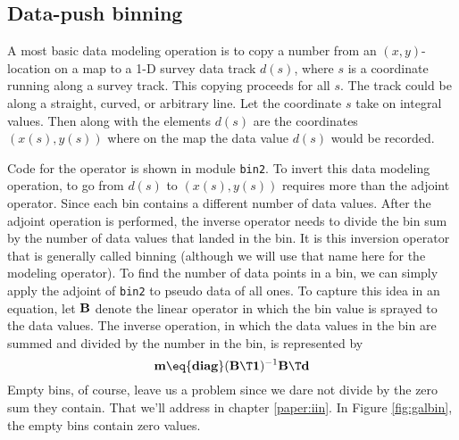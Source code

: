 \subsection{Data-push binning}
A most basic data modeling operation is to copy a number from an $(x,y)$-location on a map
to a 1-D survey data track $d(s)$, where $s$ is a coordinate running along a survey track.
This copying proceeds for all $s$.
The track could be along a straight, curved, or arbitrary line.
Let the coordinate $s$ take on integral values.
Then along with the elements $d(s)$ are the coordinates $(x(s),y(s))$ where on the map the data value $d(s)$ would be recorded.
\par
Code for the operator is shown
in module \texttt{bin2}.
To invert this data modeling operation, to go from $d(s)$ to $(x(s),y(s))$ requires more than the adjoint operator.
Since each bin contains a different number of data values.
After the adjoint operation is performed,
the inverse operator needs to divide the bin sum by the number of data values that landed in the bin.
It is this inversion operator that is generally called binning (although we will use that name here for the modeling operator).
To find the number of data points in a bin,
we can simply apply the adjoint of \texttt{bin2} to pseudo data of all ones.
To capture this idea in an equation,
let $\bold B$ denote the linear operator
in which the bin value is sprayed to the data values.
The inverse operation,
in which the data values in the bin are summed
and divided by the number in the bin, is represented by
\begin{equation}
\bold m \eq {\bf diag}( \bold B\T \bold 1)^{-1} \bold B\T \bold d
\label{eqn:dpbin}
\end{equation}
Empty bins, of course, leave us a problem since we dare not divide by the zero sum they contain.
That we'll address in chapter \ref{paper:iin}.
In Figure \ref{fig:galbin}, the empty bins contain zero values.

